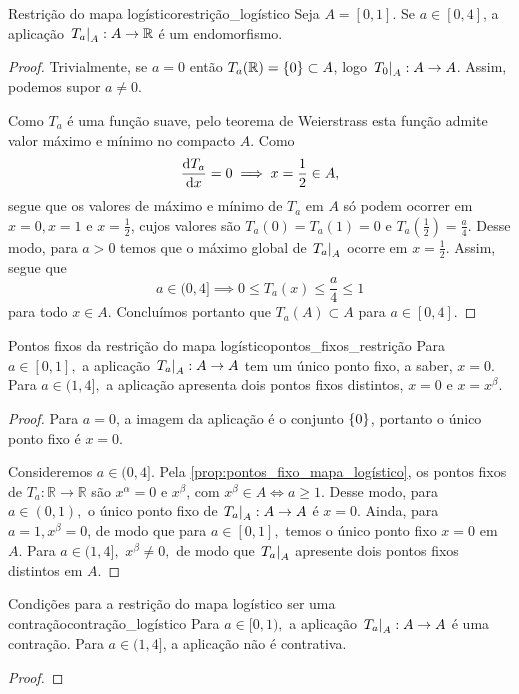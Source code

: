 \begin{proposition}{Restrição do mapa logístico}{restrição_logístico}
    Seja \(A = [0,1].\) Se \(a \in [0,4]\), a aplicação \(\left.T_a\right\rvert_{A} : A \to \mathbb{R}\) é um endomorfismo.
\end{proposition}
\begin{proof}
    Trivialmente, se \(a = 0\) então \(T_a(\mathbb{R}) = \{0\} \subset A\), logo \(\left.T_0\right\rvert_{A} : A \to A\). Assim, podemos supor \(a \neq 0\).

    Como \(T_a\) é uma função suave, pelo teorema de Weierstrass esta função admite valor máximo e mínimo no compacto \(A\). Como
    \begin{equation*}
        \diff{T_a}{x} = 0 \implies x = \frac12 \in A,
    \end{equation*}
    segue que os valores de máximo e mínimo de \(T_a\) em \(A\) só podem ocorrer em \(x = 0, x = 1\) e \(x = \frac12\), cujos valores são \(T_a(0) = T_a(1) = 0\) e \(T_a(\frac12) = \frac{a}4\). Desse modo, para \(a > 0\) temos que o máximo global de \(\left.T_a\right\rvert_{A}\) ocorre em \(x = \frac12\). Assim, segue que
    \begin{equation*}
        a \in (0, 4] \implies 0 \leq T_a(x) \leq \frac{a}{4} \leq 1
    \end{equation*}
    para todo \(x \in A\). Concluímos portanto que \(T_a(A) \subset A\) para \(a \in [0,4]\).
\end{proof}

\begin{proposition}{Pontos fixos da restrição do mapa logístico}{pontos_fixos_restrição}
    Para \(a \in [0,1],\) a aplicação \(\left.T_a\right\rvert_{A} : A \to A\) tem um único ponto fixo, a saber, \(x = 0\). Para \(a \in (1, 4],\) a aplicação apresenta dois pontos fixos distintos, \(x = 0\) e \(x = x^\beta\).
\end{proposition}
\begin{proof}
    Para \(a = 0\), a imagem da aplicação é o conjunto \(\{0\}\), portanto o único ponto fixo é \(x = 0\).

    Consideremos \(a \in (0, 4]\). Pela \cref{prop:pontos_fixo_mapa_logístico}, os pontos fixos de \(T_a : \mathbb{R} \to \mathbb{R}\) são \(x^\alpha = 0\) e \(x^\beta\), com \(x^\beta \in A\iff a \geq 1\). Desse modo, para \(a \in (0, 1),\) o único ponto fixo de \(\left.T_a\right\rvert_{A}: A \to A\) é \(x = 0\). Ainda, para \(a = 1, x^\beta = 0\), de modo que para \(a \in [0,1], \) temos o único ponto fixo \(x = 0\) em \(A\). Para \(a \in (1, 4],\) \(x^\beta \neq 0,\) de modo que \(\left.T_a\right\rvert_{A}\) apresente dois pontos fixos distintos em \(A\).
\end{proof}

\begin{proposition}{Condições para a restrição do mapa logístico ser uma contração}{contração_logístico}
    Para \(a \in [0,1),\) a aplicação \(\left.T_a\right\rvert_{A} : A \to A\) é uma contração. Para \(a \in (1, 4]\), a aplicação não é contrativa.
\end{proposition}
\begin{proof}

\end{proof}
